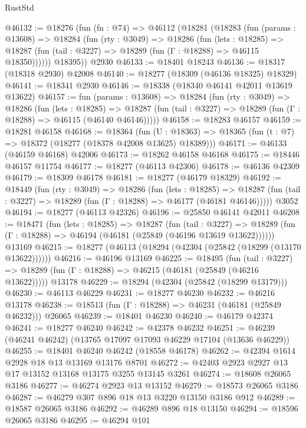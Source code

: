 \begin{lexlean}{RustStd}
\begin{coremodule}
@46132 := @18276
    (fun (fn : @74) =>
    @46112
      (@18281
        (@18283
          (fun (params : @13608) =>
          @18284
            (fun (rty : @3049) =>
            @18286
              (fun (lets : @18285) =>
              @18287 (fun (tail : @3227) => @18289 (fun (Γ : @18288) => @46115 @18350))))))
        @18395))
    @2930
@46133 := @18401 @18243
@46136 := @18317 (@18318 @2930) @42008
@46140 := @18277 (@18309 (@46136 @18325) @18329)
@46141 := @18341 @2930
@46146 := @18338 (@18340 @46141 @42011 @13619 @13622)
@46157 := fun (params : @13608) =>
  @18284
    (fun (rty : @3049) =>
    @18286
      (fun (lets : @18285) =>
      @18287 (fun (tail : @3227) => @18289 (fun (Γ : @18288) => @46115 (@46140 @46146)))))
@46158 := @18283 @46157
@46159 := @18281 @46158
@46168 := @18364
    (fun (U : @18363) => @18365 (fun (t : @7) => @18372 (@18277 (@18378 @42008 @13625) @18389)))
@46171 := @46133 (@46159 @46168) @42006
@46173 := @18262 @46158 @46168
@46175 := @18446 @46157 @11754
@46177 := @18277 (@46113 @42306)
@46178 := @46136 @42309
@46179 := @18309 @46178
@46181 := @18277 (@46179 @18329)
@46192 := @18449
    (fun (rty : @3049) =>
    @18286
      (fun (lets : @18285) =>
      @18287 (fun (tail : @3227) => @18289 (fun (Γ : @18288) => @46177 (@46181 @46146)))))
    @3052
@46194 := @18277 (@46113 @42326)
@46196 := @25850 @46141 @42011
@46208 := @18471
    (fun (lets : @18285) =>
    @18287
      (fun (tail : @3227) =>
      @18289 (fun (Γ : @18288) => @46194 (@46181 (@25849 (@46196 @13619 @13622))))))
    @13169
@46215 := @18277 (@46113 (@18294 (@42304 (@25842 (@18299 (@13170 @13622))))))
@46216 := @46196 @13169
@46225 := @18495
    (fun (tail : @3227) => @18289 (fun (Γ : @18288) => @46215 (@46181 (@25849 (@46216 @13622)))))
    @13178
@46229 := @18294 (@42304 (@25842 (@18299 @13179)))
@46230 := @46113 @46229
@46231 := @18277 @46230
@46232 := @46216 @13178
@46238 := @18513 (fun (Γ : @18288) => @46231 (@46181 (@25849 @46232))) @26065
@46239 := @18401 @46230
@46240 := @46179 @42374
@46241 := @18277 @46240
@46242 := @42378 @46232
@46251 := @46239 (@46241 @46242) (@13765 @17097 @17093 @46229 @17104 (@13636 @46229))
@46255 := @18401 @46240 @46242 (@18558 @46178)
@46262 := @42394 @1614 @2928 @18 @13 @13169 @13176 @8701
@46272 := @42403 @2923 @2927 @13 @17 @13152 @13168 @13175 @3255 @13145 @3261
@46274 := @18608 @26065 @3186
@46277 := @46274 @2923 @13 @13152
@46279 := @18573 @26065 @3186
@46287 := @46279 @307 @896 @18 @13 @3220 @13150 @3186 @912
@46289 := @18587 @26065 @3186
@46292 := @46289 @896 @18 @13150
@46294 := @18596 @26065 @3186
@46295 := @46294 @101

\end{coremodule}
\end{lexlean}

